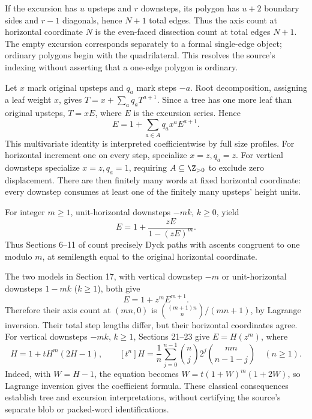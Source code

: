 If the excursion has $u$ upsteps and $r$ downsteps, its polygon has $u+2$ boundary sides and $r-1$ diagonals, hence $N+1$ total edges. Thus the axis count at horizontal coordinate $N$ is the even-faced dissection count at total edges $N+1$. The empty excursion corresponds separately to a formal single-edge object; ordinary polygons begin with the quadrilateral. This resolves the source's indexing without asserting that a one-edge polygon is ordinary.

Let $x$ mark original upsteps and $q_a$ mark steps $-a$. Root decomposition, assigning a leaf weight $x$, gives $T=x+\sum_aq_aT^{a+1}$. Since a tree has one more leaf than original upsteps, $T=xE$, where $E$ is the excursion series. Hence
\begin{equation}\label{eq:treegf}
E=1+\sum_{a\in A}q_ax^aE^{a+1}.
\end{equation}
This multivariate identity is interpreted coefficientwise by full size profiles. For horizontal increment one on every step, specialize $x=z,q_a=z$. For vertical downsteps specialize $x=z,q_a=1$, requiring $A\subseteq\Z_{>0}$ to exclude zero displacement. There are then finitely many words at fixed horizontal coordinate: every downstep consumes at least one of the finitely many upsteps' height units.

For integer $m\ge1$, unit-horizontal downsteps $-mk$, $k\ge0$, yield
\[
E=1+\frac{zE}{1-(zE)^m}.
\]
Thus Sections 6--11 of \cite{Ham2019} count precisely Dyck paths with ascents congruent to one modulo $m$, at semilength equal to the original horizontal coordinate.

The two models in Section 17, with vertical downstep $-m$ or unit-horizontal downsteps $1-mk$ ($k\ge1$), both give
\[
E=1+z^mE^{m+1}.
\]
Therefore their axis count at $(mn,0)$ is $\binom{(m+1)n}{n}/(mn+1)$, by Lagrange inversion. Their total step lengths differ, but their horizontal coordinates agree. For vertical downsteps $-mk$, $k\ge1$, Sections 21--23 give $E=H(z^m)$, where
\[
H=1+tH^m(2H-1),\qquad
[t^n]H=\frac1n\sum_{j=0}^{n-1}\binom nj2^j\binom{mn}{n-1-j}\quad(n\ge1).
\]
Indeed, with $W=H-1$, the equation becomes $W=t(1+W)^m(1+2W)$, so Lagrange inversion gives the coefficient formula. These classical consequences establish tree and excursion interpretations, without certifying the source's separate blob or packed-word identifications.
